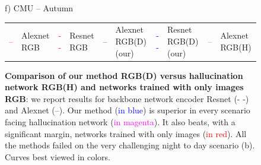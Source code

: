 \begin{figure}
\begin{minipage}{0.16\linewidth}
		f) CMU -- Autumn
	\end{minipage}
	
	\vspace{0.2cm}
	
	\begin{scriptsize}
	\begin{tabular}{c l c l c l c l c l }
		\textcolor{red}{\Large{--}} & Alexnet RGB & 
		\textcolor{red}{\Large{- -}} & Resnet RGB & 
		\textcolor{blue}{\Large{--}} & Alexnet RGB(D) (our) &
		\textcolor{blue}{\Large{- -}} & Resnet RGB(D) (our) &  
		\textcolor{magenta}{\Large{--}} & Alexnet RGB(H)  \\
	\end{tabular}		
	\end{scriptsize}
	
	\caption[Comparison of our method versus competitors]{\label{fig:results} \textbf{Comparison of our method RGB(D) versus hallucination network RGB(H) and networks trained with only images RGB}: we report results for backbone network encoder Resnet (- -) and Alexnet (--). Our method (\textcolor{blue}{in blue}) is superior in every scenario facing hallucination network (\textcolor{magenta}{in magenta}). It also beats, with a significant margin, networks trained with only images (\textcolor{red}{in red}). All the methods failed on the very challenging night to day scenario (b). Curves best viewed in colors.}
\end{figure}